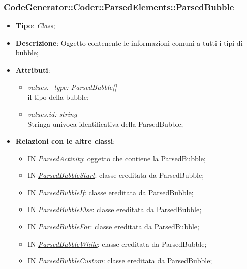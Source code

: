 \documentclass[../DefinizioneDiProdotto.tex]{subfiles}
\begin{document}
			\subsubsection{CodeGenerator::Coder::ParsedElements::ParsedBubble}
		\hypertarget{SWEDesigner::Server::CodeGenerator::Coder::ParsedElements::ParsedBubble}{}
		\begin{itemize}
			\item \textbf{Tipo}: \emph{Class};
			\item \textbf{Descrizione}: Oggetto contenente le informazioni comuni a tutti i tipi di bubble;
			\item \textbf{Attributi}:
			\begin{itemize}
				\item \emph{values.\_type: ParsedBubble[]} \\
				il tipo della bubble;
				\item \emph{values.id: string} \\
				Stringa univoca identificativa della ParsedBubble;
			\end{itemize}
			\item \textbf{Relazioni con le altre classi}:	
			\begin{itemize}
				\item IN \hyperlink{SWEDesigner::Server::CodeGenerator::Coder::ParsedElements::ParsedActivity}{\emph{ParsedActivity}}: oggetto che contiene la ParsedBubble;
				\item IN \hyperlink{SWEDesigner::Server::CodeGenerator::Coder::ParsedElements::ParsedBubbleStart}{\emph{ParsedBubbleStart}}: classe ereditata da ParsedBubble;
				\item IN \hyperlink{SWEDesigner::Server::CodeGenerator::Coder::ParsedElements::ParsedBubbleIf}{\emph{ParsedBubbleIf}}: classe ereditata da ParsedBubble;
				\item IN \hyperlink{SWEDesigner::Server::CodeGenerator::Coder::ParsedElements::ParsedBubbleElse}{\emph{ParsedBubbleElse}}: classe ereditata da ParsedBubble;
				\item IN \hyperlink{SWEDesigner::Server::CodeGenerator::Coder::ParsedElements::ParsedBubbleFor}{\emph{ParsedBubbleFor}}: classe ereditata da ParsedBubble;
				\item IN \hyperlink{SWEDesigner::Server::CodeGenerator::Coder::ParsedElements::ParsedBubbleWhile}{\emph{ParsedBubbleWhile}}: classe ereditata da ParsedBubble;
				\item IN \hyperlink{SWEDesigner::Server::CodeGenerator::Coder::ParsedElements::ParsedBubbleCustom}{\emph{ParsedBubbleCustom}}: classe ereditata da ParsedBubble;

\end{itemize}
\end{itemize}
\end{document}

